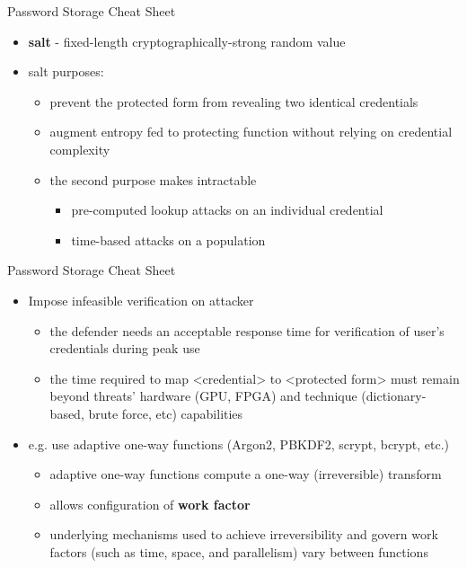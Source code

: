 \documentclass[pdf]{beamer}
\begin{document}
\begin{frame}{Password Storage Cheat Sheet}
\begin{itemize}
\item
\textbf{salt}  - fixed-length cryptographically-strong random value

\item
salt purposes:

\begin{itemize}
\item
prevent the protected form from revealing two identical credentials
\item
augment entropy fed to protecting function without relying on credential complexity
\item
the second purpose makes intractable
\begin{itemize}
\item
pre-computed lookup attacks on an individual credential
\item
time-based attacks on a population 
\end{itemize}
\end{itemize}

\end{itemize}
\end{frame}



\begin{frame}{Password Storage Cheat Sheet}
\begin{itemize}
\item
Impose infeasible verification on attacker
\begin{itemize}
\item
the defender needs an acceptable response time for verification of user’s credentials during peak use
\item
the time required to map <credential> to <protected form> must remain beyond threats’ hardware (GPU, FPGA) and technique (dictionary-based, brute force, etc) capabilities
\end{itemize}
\item
e.g. use adaptive one-way functions (Argon2, PBKDF2, scrypt, bcrypt, etc.)
\begin{itemize}
\item
adaptive one-way functions compute a one-way (irreversible) transform
\item
allows configuration of \textbf{work factor}
\item
underlying mechanisms used to achieve irreversibility and govern work factors (such as time, space, and parallelism) vary between functions 
\end{itemize}
\end{itemize}
\end{frame}
\end{document}
